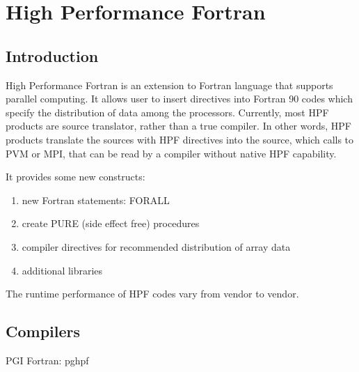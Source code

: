 
\chapter{High Performance Fortran}
\label{chap:high-perf-fortr}


\section{Introduction}
\label{sec:introduction-2}


High Performance Fortran is an extension to Fortran language that
supports parallel computing. It allows user to insert directives into
Fortran 90 codes which specify the distribution of data among the
processors. Currently, most HPF products are source translator, rather
than a true compiler. In other words, HPF products translate the
sources with HPF directives into the source, which calls to PVM or
MPI, that can be read by a compiler without native HPF capability.

It provides some new constructs:
\begin{enumerate}
\item new Fortran statements: FORALL
\item create PURE (side effect free) procedures
\item compiler directives for recommended distribution of array data
\item additional libraries
\end{enumerate}

The runtime performance of HPF codes vary from vendor to vendor. 


\section{Compilers}
\label{sec:compilers}


PGI Fortran: pghpf


